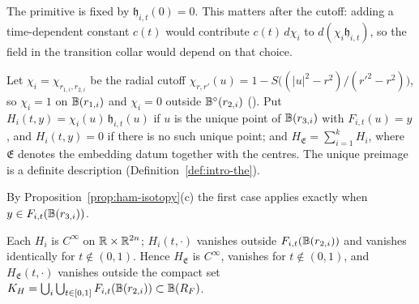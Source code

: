 The primitive is fixed by $\mathfrak h_{i,t}(0)=0$. This matters after the cutoff: adding a time-dependent constant
$c(t)$ would contribute $c(t)\,d\chi_i$ to $d(\chi_i\mathfrak h_{i,t})$, so the field in the transition collar would
depend on that choice.

\begin{definition}\label{def:ham-H}
Let $\chi_i=\chi_{r_{1,i},r_{2,i}}$ be the radial cutoff $\chi_{r,r'}(u)=1-S\big((|u|^2-r^2)/(r'^2-r^2)\big)$, so
$\chi_i=1$ on $\mathbb{B}(r_{1,i})$ and $\chi_i=0$ outside $\mathbb{B}^\circ(r_{2,i})$ (). Put
$H_i(t,y)=\chi_i(u)\,\mathfrak h_{i,t}(u)$ if $u$ is the unique point of $\mathbb{B}(r_{3,i})$ with $F_{i,t}(u)=y$, and
$H_i(t,y)=0$ if there is no such unique point; and $H_{\mathfrak E}=\sum_{i=1}^kH_i$, where $\mathfrak E$ denotes the embedding
datum together with the centres. The unique preimage is a definite description (Definition~\ref{def:intro-the}).
\end{definition}

By Proposition~\ref{prop:ham-isotopy}(c) the first case applies exactly when $y\in F_{i,t}(\mathbb{B}(r_{3,i}))$.

\begin{lemma}\label{lem:ham-smooth}
Each $H_i$ is $C^\infty$ on $\mathbb{R}\times\mathbb{R}^{2n}$; $H_i(t,\cdot)$ vanishes outside $F_{i,t}(\mathbb{B}(r_{2,i}))$ and vanishes
identically for $t\notin(0,1)$. Hence $H_{\mathfrak E}$ is $C^\infty$, vanishes for $t\notin(0,1)$, and $H_{\mathfrak E}(t,\cdot)$
vanishes outside the compact set $K_H=\bigcup_i\bigcup_{t\in[0,1]}F_{i,t}(\mathbb{B}(r_{2,i}))\subset\mathbb{B}(R_F)$.
\end{lemma}

